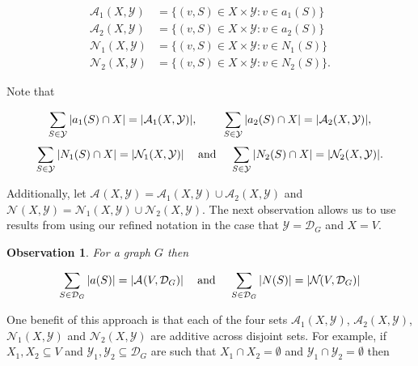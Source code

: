 \documentclass[11pt]{article}
\newtheorem{observation}[definition]{Observation}
\newcommand{\A}[3][\mathcal{D}_G]{\mathcal{A}_{#3}(#2, #1)}
\newcommand{\N}[3][\mathcal{D}_G]{\mathcal{N}_{#3}(#2, #1)}
\begin{document}
\vspace{-6mm}

\begin{align*}
\A[\mathcal{Y}]{X}{1} &= \{(v,S) \in X \times \mathcal{Y} : v \in a_1(S)\}\\
\A[\mathcal{Y}]{X}{2} &= \{(v,S) \in X \times \mathcal{Y} : v \in a_2(S)\}\\
\N[\mathcal{Y}]{X}{1} &= \{(v,S) \in X \times \mathcal{Y} : v \in N_1(S)\}\\
\N[\mathcal{Y}]{X}{2} &= \{(v,S) \in X \times \mathcal{Y} : v \in N_2(S)\}.
\end{align*}

\vspace{-6mm}

\noindent Note that 


$$\sum\limits_{S \in \mathcal{Y}}|a_1(S) \cap X| = |\A[\mathcal{Y}]{X}{1}|, \text{ }\hspace{2mm}\text{  }\hspace{2mm}\text{ } \sum\limits_{S \in \mathcal{Y}}|a_2(S) \cap X| = |\A[\mathcal{Y}]{X}{2}|,$$
$$ \sum\limits_{S \in \mathcal{Y}}|N_1(S) \cap X|  = |\N[\mathcal{Y}]{X}{1}| \text{ }\hspace{2mm}\text{ and }\hspace{2mm}\text{ } \sum\limits_{S \in \mathcal{Y}}|N_2(S) \cap X| = |\N[\mathcal{Y}]{X}{2}|.$$


\noindent Additionally, let $\A[\mathcal{Y}]{X}{}=\A[\mathcal{Y}]{X}{1} \cup \A[\mathcal{Y}]{X}{2}$  and $\N[\mathcal{Y}]{X}{}=\N[\mathcal{Y}]{X}{1} \cup \N[\mathcal{Y}]{X}{2}$. The next observation allows us to use results from \cite{2021Beaton} using our refined notation in the case that $\mathcal{Y} =  \mathcal{D}_G$ and $X=V$.

\begin{observation}
\label{obs:NewNotation}
For a graph $G$ then

$$\sum\limits_{S \in \mathcal{D}_G}|a(S)| = |\A{V}{}| \text{ }\hspace{2mm}\text{ and }\hspace{2mm}\text{ } \sum\limits_{S \in \mathcal{D}_G}|N(S)| = |\N{V}{}|$$
\end{observation}





One benefit of this approach is that each of the four sets $\A[\mathcal{Y}]{X}{1}$, $\A[\mathcal{Y}]{X}{2}$, $\N[\mathcal{Y}]{X}{1}$ and $\N[\mathcal{Y}]{X}{2}$ are additive across disjoint sets. For example, if $X_1, X_2 \subseteq V$ and $\mathcal{Y}_1, \mathcal{Y}_2 \subseteq \mathcal{D}_G$ are such that $X_1 \cap X_2 = \emptyset$ and $\mathcal{Y}_1 \cap \mathcal{Y}_2 = \emptyset$ then 
\end{document}
